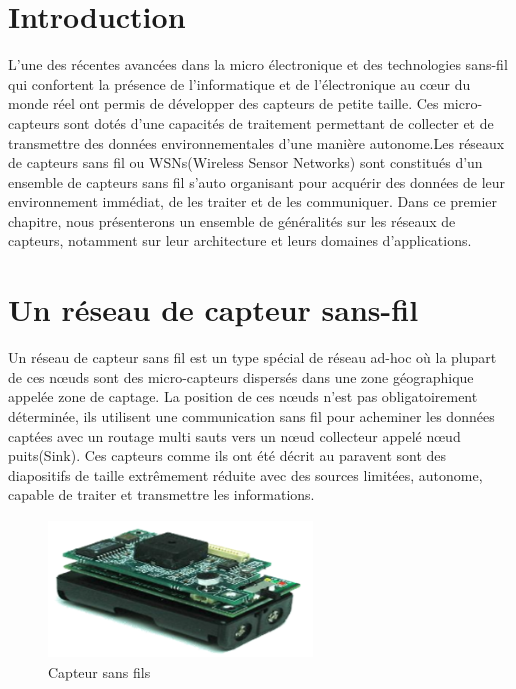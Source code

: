 


\section{Introduction}
L’une des récentes avancées dans la micro électronique et des technologies sans-fil qui confortent la présence de l’informatique et de l’électronique au cœur du monde réel ont permis de développer des capteurs de petite taille. Ces  micro-capteurs sont dotés d’une capacités de traitement permettant de collecter et de transmettre des données environnementales d'une manière autonome.Les réseaux de capteurs sans fil ou WSNs(Wireless Sensor Networks) sont constitués d’un ensemble de capteurs sans fil s’auto organisant pour acquérir des données de leur environnement immédiat, de les traiter et de les communiquer.
Dans ce premier chapitre, nous présenterons un ensemble de généralités sur les réseaux de capteurs, notamment sur leur architecture et leurs domaines d’applications.\\

\section{Un réseau de capteur sans-fil}
Un réseau de capteur sans fil est un type spécial de réseau ad-hoc où la plupart de ces nœuds sont des micro-capteurs dispersés dans une zone géographique appelée zone de captage. La position de ces nœuds n’est pas obligatoirement déterminée, ils utilisent une communication sans fil pour acheminer les données captées avec un routage multi sauts vers un nœud collecteur appelé nœud puits(Sink). Ces capteurs comme ils ont été décrit au paravent  sont des diapositifs de taille extrêmement réduite avec des sources limitées, autonome, capable de traiter et transmettre les informations.\\
\begin{figure}[H]
	\centering
	\includegraphics[width=7cm,height=3.7cm]{Chap1/1.png}
	\caption{Capteur sans fils}
	\label{fig:CSF}
\end{figure}


